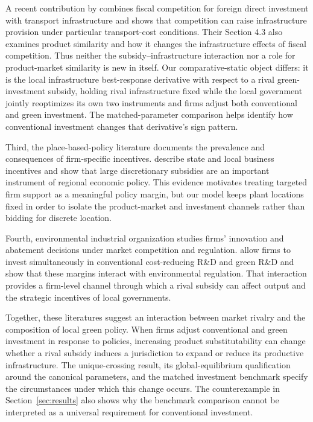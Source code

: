 A recent contribution by \citet{MoritaOkoshi2025} combines fiscal competition for foreign direct investment with transport infrastructure and shows that competition can raise infrastructure provision under particular transport-cost conditions. Their Section 4.3 also examines product similarity and how it changes the infrastructure effects of fiscal competition. Thus neither the subsidy--infrastructure interaction nor a role for product-market similarity is new in itself. Our comparative-static object differs: it is the local infrastructure best-response derivative with respect to a rival green-investment subsidy, holding rival infrastructure fixed while the local government jointly reoptimizes its own two instruments and firms adjust both conventional and green investment. The matched-parameter comparison helps identify how conventional investment changes that derivative's sign pattern.

Third, the place-based-policy literature documents the prevalence and consequences of firm-specific incentives. \citet{SlatteryZidar2020} describe state and local business incentives and show that large discretionary subsidies are an important instrument of regional economic policy. This evidence motivates treating targeted firm support as a meaningful policy margin, but our model keeps plant locations fixed in order to isolate the product-market and investment channels rather than bidding for discrete location.

Fourth, environmental industrial organization studies firms' innovation and abatement decisions under market competition and regulation. \citet{StrandholmEspinolaMunoz2025} allow firms to invest simultaneously in conventional cost-reducing R\&D and green R\&D and show that these margins interact with environmental regulation. That interaction provides a firm-level channel through which a rival subsidy can affect output and the strategic incentives of local governments.

Together, these literatures suggest an interaction between market rivalry and the composition of local green policy. When firms adjust conventional and green investment in response to policies, increasing product substitutability can change whether a rival subsidy induces a jurisdiction to expand or reduce its productive infrastructure. The unique-crossing result, its global-equilibrium qualification around the canonical parameters, and the matched investment benchmark specify the circumstances under which this change occurs. The counterexample in Section~\ref{sec:results} also shows why the benchmark comparison cannot be interpreted as a universal requirement for conventional investment.